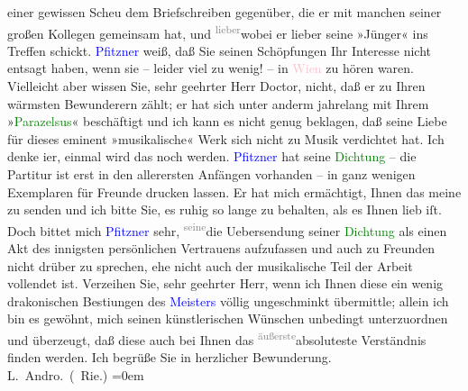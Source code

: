                     einer gewissen Scheu dem Briefschreiben gegenüber, die er mit {\pb}manchen seiner großen Kollegen gemeinsam hat, und \substVorne{}\textsuperscript{\textcolor{gray}{lieber}}{\allowbreak}\substDazwischen{}wobei\substHinten{} er lieber seine »Jünger« ins Treffen schickt.\pend
           \pstart
           \textcolor{blue}{Pfitzner}{}\ledrightnote{\textcolor{blue}{Hans Pfitzner}} weiß, daß Sie seinen Schöpfungen Ihr
                    Interesse nicht entsagt haben, wenn sie – leider viel zu wenig! – in \textcolor{pink}{Wien}{}\ledrightnote{\textcolor{pink}{Wien}} zu hören waren. Vielleicht aber wissen Sie,
                    sehr geehrter Herr Doctor, nicht, daß er zu Ihren wärmsten Bewunderern zählt; er
                    hat sich unter anderm jahrelang mit Ihrem »\textcolor{green}{Parazelsus}{}\ledrightnote{\textcolor{green}{Paracelsus. Versspiel in einem Akt}}« beschäftigt und ich kann es nicht genug beklagen, daß
                    seine Liebe für dieses eminent »musikalische« Werk sich nicht zu Musik
                    verdichtet hat. Ich denke i{\geminationm}er, einmal wird das
                    noch werden.\pend
           \pstart
           \textcolor{blue}{Pfitzner}{}\ledrightnote{\textcolor{blue}{Hans Pfitzner}} hat seine \textcolor{green}{Dichtung}{} – die Partitur ist erst in den
                    allerersten Anfängen vorhanden – in ganz wenigen Exemplaren für Freunde drucken
                    lassen. Er hat mich ermächtigt, Ihnen das meine zu senden und ich bitte Sie, es
                    ruhig so lange zu behalten, als es Ihnen lieb iſt. Doch bittet mich \textcolor{blue}{Pfitzner}{}\ledrightnote{\textcolor{blue}{Hans Pfitzner}} sehr, \substVorne{}\textsuperscript{\textcolor{gray}{seine}}\substDazwischen{}die Ueber\substHinten{}sendung seiner \textcolor{green}{Dichtung}{} als einen Akt des innigsten persönlichen Vertrauens
                    aufzufassen und auch zu Freunden nicht drüber zu sprechen, ehe nicht auch der
                    musikalische Teil der Arbeit vollendet ist.\pend
           \pstart
           Verzeihen Sie, sehr geehrter Herr, wenn ich Ihnen diese ein wenig drakonischen
                        Besti{\geminationm}ungen des \textcolor{blue}{Meisters}{} völlig ungeschminkt übermittle; allein ich
                    bin es gewöhnt, mich seinen künstlerischen Wünschen unbedingt unterzuordnen und
                    überzeugt, daß diese auch bei Ihnen das {\pb}\substVorne{}\textsuperscript{\textcolor{gray}{äußerste}}{\allowbreak}\substDazwischen{}absoluteste\substHinten{} Verständnis finden werden.\pend
           \pstart
           Ich begrüße Sie in herzlicher Bewunderung.{\\[\baselineskip]}\spacefill\mbox{L. Andro. (\label{K_L02569-1v}\label{K_L02569-1h} Rie.)}\pend
           \leftskip=0em{}\endnumbering{}  
      